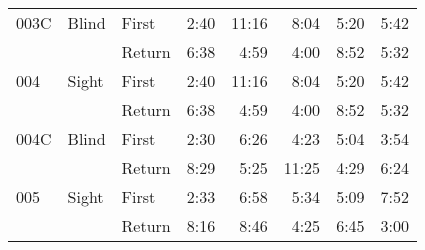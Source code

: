 \begin{table}[!htb]
\begin{tabular}{lllrrrrr}
003C & Blind & First &   2:40 &  11:16 &                                                  8:04 &                                                   5:20 &    5:42 \\
    &       & Return &   6:38 &   4:59 &                                                  4:00 &                                                   8:52 &    5:32 \\
004 & Sight & First &   2:40 &  11:16 &                                                  8:04 &                                                   5:20 &    5:42 \\
    &       & Return &   6:38 &   4:59 &                                                  4:00 &                                                   8:52 &    5:32 \\
004C & Blind & First &   2:30 &   6:26 &                                                  4:23 &                                                   5:04 &    3:54 \\
    &       & Return &   8:29 &   5:25 &                                                 11:25 &                                                   4:29 &    6:24 \\
005 & Sight & First &   2:33 &   6:58 &                                                  5:34 &                                                   5:09 &    7:52 \\
    &       & Return &   8:16 &   8:46 &                                                  4:25 &                                                   6:45 &    3:00 \\
\bottomrule
\end{tabular}
\end{table}

